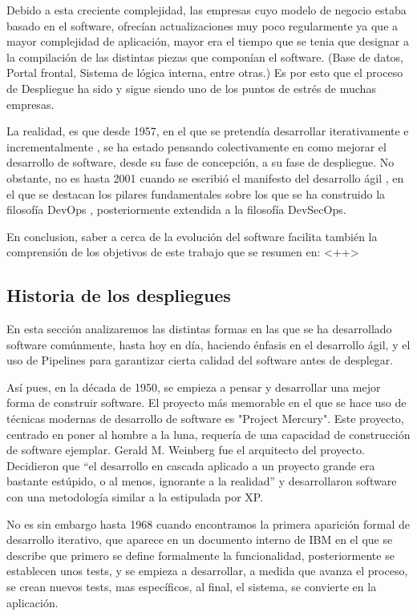 \documentclass[12pt]{report} %
\begin{document}
Debido a esta creciente complejidad, las empresas cuyo modelo de negocio estaba basado en el software, ofrecían actualizaciones muy poco regularmente ya que a mayor complejidad de aplicación, mayor era el tiempo que se tenia que designar a la compilación de las distintas piezas que componían el software. (Base de datos, Portal frontal, Sistema de lógica interna, entre otras.)
Es por esto que el proceso de Despliegue ha sido y sigue siendo uno de los puntos de estrés de muchas empresas.

La realidad, es que desde 1957, en el que se pretendía desarrollar iterativamente e incrementalmente \cite{IID}, se ha estado pensando colectivamente en como mejorar el desarrollo de software, desde su fase de concepción, a su fase de despliegue.
No obstante, no es hasta 2001 cuando se escribió el manifesto del desarrollo ágil \cite{agile}, en el que se destacan los pilares fundamentales sobre los que se ha construido la filosofía DevOps \cite{CD-TF}, posteriormente extendida a la filosofía DevSecOps.

En conclusion, saber a cerca de la evolución del software facilita también la comprensión de los objetivos de este trabajo que se resumen en: <++> %


\subsection{Historia de los despliegues}

En esta sección analizaremos las distintas formas en las que se ha desarrollado software comúnmente, hasta hoy en día, haciendo énfasis en el desarrollo ágil, y el uso de Pipelines para garantizar cierta calidad del software antes de desplegar.

Así pues, en la década de 1950, se empieza a pensar y desarrollar una mejor forma de construir software.
El proyecto más memorable en el que se hace uso de técnicas modernas de desarrollo de software es "Project Mercury".
Este proyecto, centrado en poner al hombre a la luna, requería de una capacidad de construcción de software ejemplar.
Gerald M. Weinberg fue el arquitecto del proyecto.
Decidieron que ``el desarrollo en cascada aplicado a un proyecto grande era bastante estúpido, o al menos, ignorante a la realidad'' \cite{GW-PM} y desarrollaron software con una metodología similar a la estipulada por XP. \cite{XP}

No es sin embargo hasta 1968 cuando encontramos la primera aparición formal de desarrollo iterativo, que aparece en un documento interno de IBM en el que se describe que primero se define formalmente la funcionalidad, posteriormente se establecen unos tests, y se empieza a desarrollar, a medida que avanza el proceso, se crean nuevos tests, mas específicos, al final, el sistema, se convierte en la aplicación. \cite{ID-FB}
\end{document}
